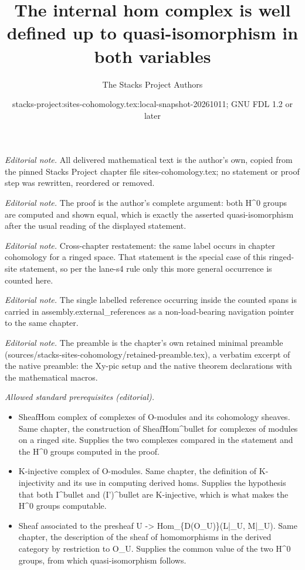 \documentclass[10pt,a4paper]{amsart}
\title{The internal hom complex is well defined up to quasi-isomorphism in both variables}
\author{The Stacks Project Authors}
\date{stacks-project:sites-cohomology.tex:local-snapshot-20261011; GNU FDL 1.2 or later}
\theoremstyle{plain}
\theoremstyle{definition}
\theoremstyle{remark}
\numberwithin{equation}{subsection}
\begin{document}
\maketitle
\noindent\textit{Editorial note.} All delivered mathematical text is the author's own, copied from the pinned Stacks Project chapter file sites-cohomology.tex; no statement or proof step was rewritten, reordered or removed.\par\medskip
\noindent\textit{Editorial note.} The proof is the author's complete argument: both H\textasciicircum{}0 groups are computed and shown equal, which is exactly the asserted quasi-isomorphism after the usual reading of the displayed statement.\par\medskip
\noindent\textit{Editorial note.} Cross-chapter restatement: the same label occurs in chapter cohomology for a ringed space. That statement is the special case of this ringed-site statement, so per the lane-s4 rule only this more general occurrence is counted here.\par\medskip
\noindent\textit{Editorial note.} The single labelled reference occurring inside the counted spans is carried in assembly.external\_references as a non-load-bearing navigation pointer to the same chapter.\par\medskip
\noindent\textit{Editorial note.} The preamble is the chapter's own retained minimal preamble (sources/stacks-sites-cohomology/retained-preamble.tex), a verbatim excerpt of the native preamble: the Xy-pic setup and the native theorem declarations with the mathematical macros.\par\medskip
\noindent\textit{Allowed standard prerequisites (editorial).}\begin{itemize}
\item SheafHom complex of complexes of O-modules and its cohomology sheaves. Same chapter, the construction of SheafHom\textasciicircum{}bullet for complexes of modules on a ringed site. Supplies the two complexes compared in the statement and the H\textasciicircum{}0 groups computed in the proof.
\item K-injective complex of O-modules. Same chapter, the definition of K-injectivity and its use in computing derived homs. Supplies the hypothesis that both I\textasciicircum{}bullet and (I')\textasciicircum{}bullet are K-injective, which is what makes the H\textasciicircum{}0 groups computable.
\item Sheaf associated to the presheaf U -> Hom\_\{D(O\_U)\}(L|\_U, M|\_U). Same chapter, the description of the sheaf of homomorphisms in the derived category by restriction to O\_U. Supplies the common value of the two H\textasciicircum{}0 groups, from which quasi-isomorphism follows.
\end{itemize}\medskip
\end{document}
